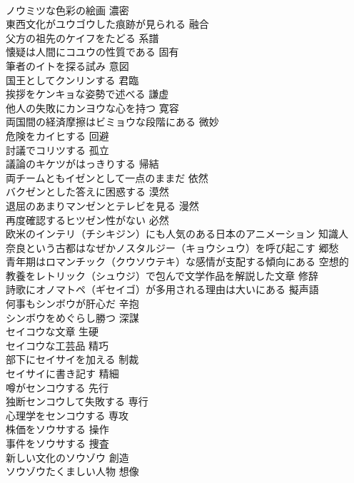 \documentclass[8pt]{extreport}
\begin{document}
\begin{CJK}{UTF8}{min}
\\	ノウミツな色彩の絵画	濃密
\\	東西文化がユウゴウした痕跡が見られる	融合
\\	父方の祖先のケイフをたどる	系譜
\\	懐疑は人間にコユウの性質である	固有
\\	筆者のイトを探る試み	意図
\\	国王としてクンリンする	君臨
\\	挨拶をケンキョな姿勢で述べる	謙虚
\\	他人の失敗にカンヨウな心を持つ	寛容
\\	両国間の経済摩擦はビミョウな段階にある	微妙
\\	危険をカイヒする	回避
\\	討議でコリツする	孤立
\\	議論のキケツがはっきりする	帰結
\\	両チームともイゼンとして一点のままだ	依然
\\	バクゼンとした答えに困惑する	漠然
\\	退屈のあまりマンゼンとテレビを見る	漫然
\\	再度確認するヒツゼン性がない	必然
\\	欧米のインテリ（チシキジン）にも人気のある日本のアニメーション	知識人
\\	奈良という古都はなぜかノスタルジー（キョウシュウ）を呼び起こす	郷愁
\\	青年期はロマンチック（クウソウテキ）な感情が支配する傾向にある	空想的
\\	教養をレトリック（シュウジ）で包んで文学作品を解説した文章	修辞
\\	詩歌にオノマトペ（ギセイゴ）が多用される理由は大いにある	擬声語
\\	何事もシンボウが肝心だ	辛抱
\\	シンボウをめぐらし勝つ	深謀
\\	セイコウな文章	生硬
\\	セイコウな工芸品	精巧
\\	部下にセイサイを加える	制裁
\\	セイサイに書き記す	精細
\\	噂がセンコウする	先行
\\	独断センコウして失敗する	専行
\\	心理学をセンコウする	専攻
\\	株価をソウサする	操作
\\	事件をソウサする	捜査
\\	新しい文化のソウゾウ	創造
\\	ソウゾウたくましい人物	想像

\end{CJK}
\end{document}
